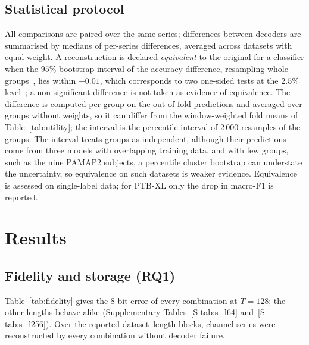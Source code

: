 \documentclass[preprint,review,12pt]{elsarticle}
\begin{document}
\subsection{Statistical protocol}
All comparisons are paired over the same series; differences between decoders are summarised by medians of per-series differences, averaged across datasets with equal weight. A reconstruction is declared \emph{equivalent} to the original for a classifier when the $95\%$ bootstrap interval of the accuracy difference, resampling whole groups~\cite{DavisonHinkley1997,Hall1987}, lies within $\pm0.01$, which corresponds to two one-sided tests at the $2.5\%$ level~\cite{Schuirmann1987,Lakens2017}; a non-significant difference is not taken as evidence of equivalence. The difference is computed per group on the out-of-fold predictions and averaged over groups without weights, so it can differ from the window-weighted fold means of Table~\ref{tab:utility}; the interval is the percentile interval of 2\,000 resamples of the groups. The interval treats groups as independent, although their predictions come from three models with overlapping training data, and with few groups, such as the nine PAMAP2 subjects, a percentile cluster bootstrap can understate the uncertainty, so equivalence on such datasets is weaker evidence. Equivalence is assessed on single-label data; for PTB-XL only the drop in macro-F1 is reported.

\FloatBarrier
\section{Results}\label{sec:results}

\subsection{Fidelity and storage (RQ1)}\label{sec:results_fidelity}
Table~\ref{tab:fidelity} gives the 8-bit error of every combination at $T=128$; the other lengths behave alike (Supplementary Tables~\ref{S-tab:s_l64} and~\ref{S-tab:s_l256}). Over the \benchBlocks{} reported dataset--length blocks, \benchSeries{} channel series were reconstructed by every combination without decoder failure.
\begin{table}[H]
\centering
\caption{Mean 8-bit NMAE of every encoding--decoder combination at $T=128$ (500 windows per dataset, 3\,000 for ESC-50; every channel). Uns./Sig.: unsigned and signed RP. Sipers' decoder reads the circular RP, a different image from the conventional RP read by the other RP decoders (Section~\ref{sec:hirata}); Supplementary Table~\ref{S-tab:s_sipers} compares the decoders on the same image. Per-series medians and interquartile ranges: Supplementary Table~\ref{S-tab:s_spread}.}\label{tab:fidelity}
\scriptsize
\setlength{\tabcolsep}{2.5pt}

\end{table}
\end{document}
